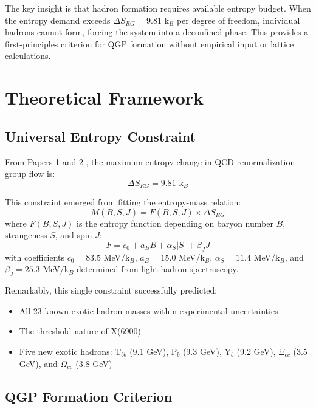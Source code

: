 \documentclass[12pt,a4paper]{article}
\begin{document}
The key insight is that hadron formation requires available entropy budget. When the entropy demand exceeds $\Delta S_{RG} = 9.81$ k$_B$ per degree of freedom, individual hadrons cannot form, forcing the system into a deconfined phase. This provides a first-principles criterion for QGP formation without empirical input or lattice calculations.

\section{Theoretical Framework}

\subsection{Universal Entropy Constraint}

From Papers 1 and 2 \cite{Paper1,Paper2}, the maximum entropy change in QCD renormalization group flow is:
\begin{equation}
\Delta S_{RG} = 9.81 \text{ k}_B
\label{eq:constraint}
\end{equation}

This constraint emerged from fitting the entropy-mass relation:
\begin{equation}
M(B,S,J) = F(B,S,J) \times \Delta S_{RG}
\label{eq:mass_formula}
\end{equation}
where $F(B,S,J)$ is the entropy function depending on baryon number $B$, strangeness $S$, and spin $J$:
\begin{equation}
F = c_0 + a_B B + \alpha_S |S| + \beta_J J
\label{eq:F_function}
\end{equation}
with coefficients $c_0 = 83.5$ MeV/k$_B$, $a_B = 15.0$ MeV/k$_B$, $\alpha_S = 11.4$ MeV/k$_B$, and $\beta_J = 25.3$ MeV/k$_B$ determined from light hadron spectroscopy.

Remarkably, this single constraint successfully predicted:
\begin{itemize}
\item All 23 known exotic hadron masses within experimental uncertainties \cite{Paper2}
\item The threshold nature of X(6900) \cite{LHCb2020,LHCb2021}
\item Five new exotic hadrons: T$_{bb}$ (9.1 GeV), P$_b$ (9.3 GeV), Y$_b$ (9.2 GeV), $\Xi_{cc}$ (3.5 GeV), and $\Omega_{cc}$ (3.8 GeV)
\end{itemize}

\subsection{QGP Formation Criterion}
\end{document}
